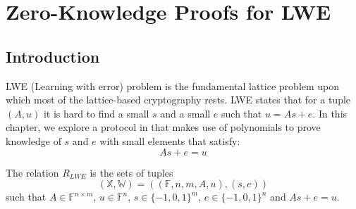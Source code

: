 \chapter{Zero-Knowledge Proofs for LWE}

\section{Introduction}

LWE (Learning with error) problem is the fundamental lattice problem upon which most of the lattice-based cryptography rests. LWE states that for a tuple $(A, u)$ it is hard to find a small $s$ and a small $e$ such that $u = As+e$. In this chapter, we explore a protocol in \cite{lwe} that makes use of polynomials to prove knowledge of $s$ and $e$ with small elements that satisfy:
$$
    As + e = u
$$

\begin{definition}
The relation $R_{LWE}$ is the sets of tuples
$$
    (\mathbb{X}, \mathbb{W}) = ((\mathbb{F}, n, m, A, u), (s, e))
$$ 
such that $A \in \mathbb{F}^{n \times m}$, $u \in \mathbb{F}^{n}$, $s \in \{-1, 0, 1\}^{m}$, $e \in \{-1, 0, 1\}^{n}$ and $As + e = u$.
\end{definition}









